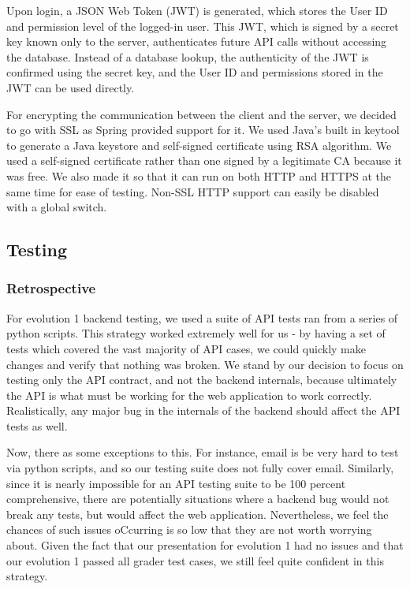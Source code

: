 \documentclass[12pt]{article}
\begin{document}
Upon login, a JSON Web Token (JWT) is generated, which stores the User ID and permission level of the logged-in user. This JWT, which is signed by a secret key known only to the server, authenticates future API calls without accessing the database. Instead of a database lookup, the authenticity of the JWT is confirmed using the secret key, and the User ID and permissions stored in the JWT can be used directly. 

For encrypting the communication between the client and the server, we decided to go with SSL as Spring provided support for it. We used Java's built in keytool to generate a Java keystore and self-signed certificate using RSA algorithm. We used a self-signed certificate rather than one signed by a legitimate CA because it was free. We also made it so that it can run on both HTTP and HTTPS at the same time for ease of testing. Non-SSL HTTP support can easily be disabled with a global switch.


\subsection{Testing}
\subsubsection{Retrospective}
For evolution 1 backend testing, we used a suite of API tests ran from a series of python scripts. This strategy worked extremely well for us - by having a set of tests which covered the vast majority of API cases, we could quickly make changes and verify that nothing was broken. We stand by our decision to focus on testing only the API contract, and not the backend internals, because ultimately the API is what must be working for the web application to work correctly. Realistically, any major bug in the internals of the backend should affect the API tests as well.


Now, there as some exceptions to this. For instance, email is be very hard to test via python scripts, and so our testing suite does not fully cover email. Similarly, since it is nearly impossible for an API testing suite to be 100 percent comprehensive, there are potentially situations where a backend bug would not break any tests, but would affect the web application. Nevertheless, we feel the chances of such issues oCcurring is so low that they are not worth worrying about. Given the fact that our presentation for evolution 1 had no issues and that our evolution 1 passed all grader test cases, we still feel quite confident in this strategy. 
\end{document}
